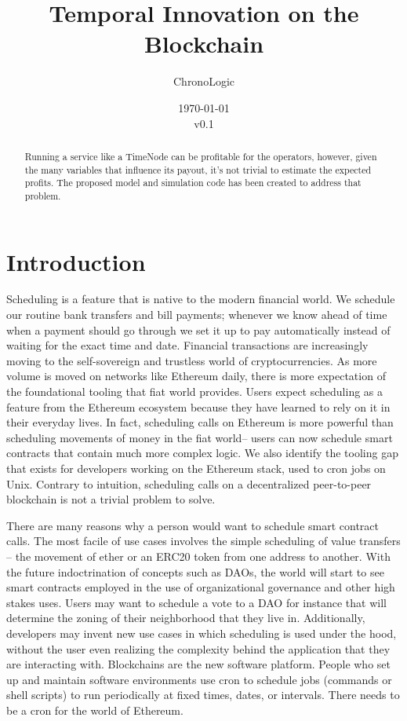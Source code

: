 \documentclass{article}
\title{Temporal Innovation on the Blockchain}
\author{ChronoLogic}
\date{\today\\v0.1}
\begin{document}
  \maketitle
  \begin{abstract}
    Running a service like a TimeNode can be profitable for the operators, however, given the many variables that influence its payout,  it's not trivial to estimate the expected profits. The proposed model and simulation code has been created to address that problem.
  \end{abstract}
  \section{Introduction}
  Scheduling is a feature that is native to the modern financial world. 
  We schedule our routine bank transfers and bill payments; whenever we know ahead of time when a payment should go through we set it up to pay automatically instead of waiting for the exact time and date. Financial transactions are increasingly moving to the self-sovereign and trustless world of cryptocurrencies. As more volume is moved on networks like Ethereum daily, there is more expectation of the foundational tooling that fiat world provides. Users expect scheduling as a feature from the Ethereum ecosystem because they have learned to rely on it in their everyday lives. In fact, scheduling calls on Ethereum is more powerful than scheduling movements of money in the fiat world-- users can now schedule smart contracts that contain much more complex logic. We also identify the tooling gap that exists for developers working on the Ethereum stack, used to cron jobs on Unix. Contrary to intuition, scheduling calls on a decentralized peer-to-peer blockchain is not a trivial problem to solve.
  
  There are many reasons why a person would want to schedule smart contract calls. The most facile of use cases involves the simple scheduling of value transfers -- the movement of ether or an ERC20 token from one address to another. With the future indoctrination of concepts such as DAOs, the world will start to see smart contracts employed in the use of organizational governance and other high stakes uses. Users may want to schedule a vote to a DAO for instance that will determine the zoning of their neighborhood that they live in. Additionally, developers may invent new use cases in which scheduling is used under the hood, without the user even realizing the complexity behind the application that they are interacting with. Blockchains are the new software platform. People who set up and maintain software environments use cron to schedule jobs (commands or shell scripts) to run periodically at fixed times, dates, or intervals. There needs to be a cron for the world of Ethereum.
\end{document}
